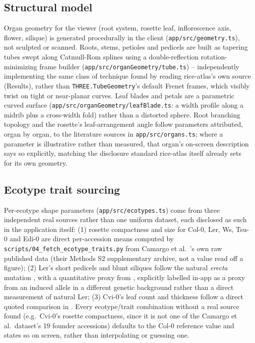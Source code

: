 \subsection{Structural model}
Organ geometry for the viewer (root system, rosette leaf, inflorescence axis, flower,
silique) is generated procedurally in the client (\texttt{app/src/geometry.ts}), not
sculpted or scanned. Roots, stems, petioles and pedicels are built as tapering tubes swept
along Catmull-Rom splines using a double-reflection rotation-minimizing frame builder
(\texttt{app/src/organGeometry/tube.ts}) -- independently implementing the same class of
technique found by reading rice-atlas's own source (Results), rather than
\texttt{THREE.TubeGeometry}'s default Frenet frames, which visibly twist on tight or
near-planar curves. Leaf blades and petals are a parametric curved surface
(\texttt{app/src/organGeometry/leafBlade.ts}: a width profile along a midrib plus a
cross-width fold) rather than a distorted sphere. Root branching topology and the
rosette's leaf-arrangement angle follow parameters attributed, organ by organ, to the
literature sources in \texttt{app/src/organs.ts}; where a parameter is illustrative rather
than measured, that organ's on-screen description says so explicitly, matching the
disclosure standard rice-atlas itself already sets for its own geometry.

\subsection{Ecotype trait sourcing}
Per-ecotype shape parameters (\texttt{app/src/ecotypes.ts}) come from three independent
real sources rather than one uniform dataset, each disclosed as such in the application
itself: (1) rosette compactness and size for Col-0, Ler, Ws, Tsu-0 and Edi-0 are direct
per-accession means computed by \texttt{scripts/04\_fetch\_ecotype\_traits.py} from Camargo
et al.\ \citeyearpar{Camargo2014}'s own raw published data (their Methods S2 supplementary
archive, not a value read off a figure); (2) Ler's short pedicels and blunt siliques follow
the natural \textit{erecta} mutation \citep{Torii1996}, with a quantitative proxy from
\citet{Bundy2012}, explicitly labelled in-app as a proxy from an induced allele in a
different genetic background rather than a direct measurement of natural Ler; (3) Cvi-0's
leaf count and thickness follow a direct quoted comparison in \citet{Coneva2018}. Every
ecotype/trait combination without a real source found (e.g.\ Cvi-0's rosette compactness,
since it is not one of the Camargo et al.\ dataset's 19 founder accessions) defaults to the
Col-0 reference value and states so on screen, rather than interpolating or guessing one.


